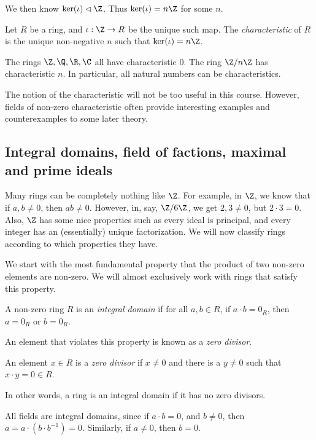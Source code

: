 \documentclass[a4paper]{article}
\begin{document}
We then know $\ker(\iota) \lhd \Z$. Thus $\ker(\iota) = n\Z$ for some $n$.

\begin{defi}
  Let $R$ be a ring, and $\iota: \Z \to R$ be the unique such map. The \emph{characteristic} of $R$ is the unique non-negative $n$ such that $\ker (\iota) = n\Z$.
\end{defi}

\begin{eg}
  The rings $\Z, \Q, \R, \C$ all have characteristic $0$. The ring $\Z / n\Z$ has characteristic $n$. In particular, all natural numbers can be characteristics.
\end{eg}
The notion of the characteristic will not be too useful in this course. However, fields of non-zero characteristic often provide interesting examples and counterexamples to some later theory.

\subsection{Integral domains, field of factions, maximal and prime ideals}
Many rings can be completely nothing like $\Z$. For example, in $\Z$, we know that if $a, b \not= 0$, then $ab \not= 0$. However, in, say, $\Z/6\Z$, we get $2, 3 \not= 0$, but $2 \cdot 3 = 0$. Also, $\Z$ has some nice properties such as every ideal is principal, and every integer has an (essentially) unique factorization. We will now classify rings according to which properties they have.

We start with the most fundamental property that the product of two non-zero elements are non-zero. We will almost exclusively work with rings that satisfy this property.
\begin{defi}
  A non-zero ring $R$ is an \emph{integral domain} if for all $a, b \in R$, if $a \cdot b = 0_R$, then $a = 0_R$ or $b = 0_R$.
\end{defi}

An element that violates this property is known as a \emph{zero divisor}.
\begin{defi}
  An element $x \in R$ is a \emph{zero divisor} if $x \not = 0$ and there is a $y \not= 0$ such that $x \cdot y = 0 \in R$.
\end{defi}
In other words, a ring is an integral domain if it has no zero divisors.

\begin{eg}
  All fields are integral domains, since if $a \cdot b = 0$, and $b \not= 0$, then $a = a\cdot (b\cdot b^{-1}) = 0$. Similarly, if $a\not= 0$, then $b = 0$.
\end{eg}
\end{document}
